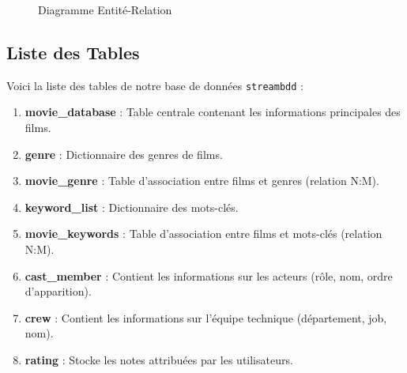 \documentclass[12pt]{article}
\begin{document}
\begin{figure}[H]
{
    }
    \caption{Diagramme Entité-Relation}
    \label{fig:er_tikz}
\end{figure}

\subsection{Liste des Tables}

Voici la liste des tables de notre base de données \texttt{streambdd} :

\begin{enumerate}
    \item \textbf{movie\_database} : Table centrale contenant les informations principales des films.
    \item \textbf{genre} : Dictionnaire des genres de films.
    \item \textbf{movie\_genre} : Table d'association entre films et genres (relation N:M).
    \item \textbf{keyword\_list} : Dictionnaire des mots-clés.
    \item \textbf{movie\_keywords} : Table d'association entre films et mots-clés (relation N:M).
    \item \textbf{cast\_member} : Contient les informations sur les acteurs (rôle, nom, ordre d'apparition).
    \item \textbf{crew} : Contient les informations sur l'équipe technique (département, job, nom).
    \item \textbf{rating} : Stocke les notes attribuées par les utilisateurs.
\end{enumerate}
\end{document}

